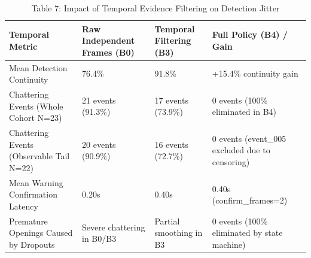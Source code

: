 \begin{table}[t]
\centering
\caption{Table 7: Impact of Temporal Evidence Filtering on Detection Jitter}
\label{tab:table07_temporal_comparison}
\begin{tabular}{llll}
\hline
Temporal Metric & Raw Independent Frames (B0) & Temporal Filtering (B3) & Full Policy (B4) / Gain \\
\hline
Mean Detection Continuity & 76.4\% & 91.8\% & +15.4\% continuity gain \\
Chattering Events (Whole Cohort N=23) & 21 events (91.3\%) & 17 events (73.9\%) & 0 events (100\% eliminated in B4) \\
Chattering Events (Observable Tail N=22) & 20 events (90.9\%) & 16 events (72.7\%) & 0 events (event\_005 excluded due to censoring) \\
Mean Warning Confirmation Latency & 0.20s & 0.40s & 0.40s (confirm\_frames=2) \\
Premature Openings Caused by Dropouts & Severe chattering in B0/B3 & Partial smoothing in B3 & 0 events (100\% eliminated by state machine) \\
\hline
\end{tabular}
\end{table}
